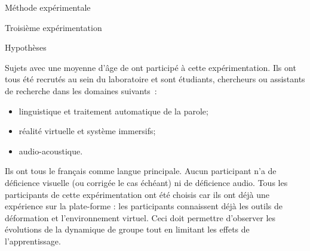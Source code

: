 \documentclass[myfrancais,ngerman,english,frenchb]{mythesis}
\begin{document}
\begin{mychapter}{Méthode expérimentale}
\begin{mysection}{Troisième expérimentation}
\begin{mysubsection}{Hypothèses}
			\end{mysubsection}
			\begin{mysubsection}{Sujets}
				 avec une moyenne d'âge de  ont participé à cette expérimentation.
				Ils ont tous été recrutés au sein du laboratoire  et sont étudiants, chercheurs ou assistants de recherche dans les domaines suivants~:
				\begin{itemize}
					\item linguistique et traitement automatique de la parole;
					\item réalité virtuelle et système immersifs;
					\item audio-acoustique.
				\end{itemize}
				Ils ont tous le français comme langue principale.
				Aucun participant n'a de déficience visuelle (ou corrigée le cas échéant) ni de déficience audio.
				Tous les participants de cette expérimentation ont été choisis car ils ont déjà une expérience sur la plate-forme : les participants connaissent déjà les outils de déformation et l'environnement virtuel.
				Ceci doit permettre d'observer les évolutions de la dynamique de groupe tout en limitant les effets de l'apprentissage.


\end{mysubsection}
\end{mysection}
\end{mychapter}
\end{document}
